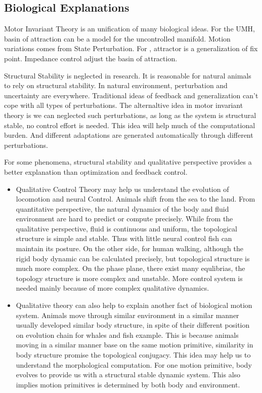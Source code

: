 \subsection{Biological Explanations}
Motor Invariant Theory is an unification of many biological ideas.
For the  UMH, basin of attraction can be a model for the uncontrolled manifold. Motion variations comes from State Perturbation.
For \eph, attractor is a generalization of fix point.
Impedance control adjust the basin of attraction.


Structural Stability is neglected in \cms research.
It is reasonable for natural animals to rely on structural stability. 
In natural environment, perturbation and uncertainty are everywhere. 
Traditional ideas of feedback and generalization can't cope with all types of perturbations.
The alternaltive idea in motor invariant theory is we can neglected such perturbations, as long as the system is structural stable, no control effort is needed.
This idea will help \cms much of the computational burden.
And different adaptations are generated automatically through different perturbations.


For some phenomena, structural stability and qualitative perspective provides a better explanation than optimization and feedback control.
\begin{itemize}
\item
Qualitative Control Theory may help us understand the evolution of locomotion and neural Control.
Animals shift from the sea to the land. 
From quantitative perspective, the natural dynamics of the body and fluid environment are hard to predict or compute precisely. 
While from the qualitative perspective, fluid is continuous and uniform, the topological structure is simple and stable.
Thus with little neural control fish can maintain its posture. 
On the other side, for human walking, although the rigid body dynamic can be calculated precisely, but topological structure is much more complex. 
On the phase plane, there exist many equlibrias, the topology structure is more complex and unstable. 
More control system is needed mainly because of more complex qualitative dynamics.

\item
Qualitative theory can also help to explain another fact of biological motion system. 
Animals move through similar environment in a similar manner usually developed similar body structure, in spite of their different position on evolution chain for whales and fish example.
This is because animals moving in a similar manner base on the same motion primitive, similarity in body structure promise the topological conjugacy.
This idea may help us to understand the morphological computation. 
For one motion primitive, body evolves to provide us with a structural stable dynamic system.
This also implies motion primitives is determined by both body and environment.
\end{itemize}



